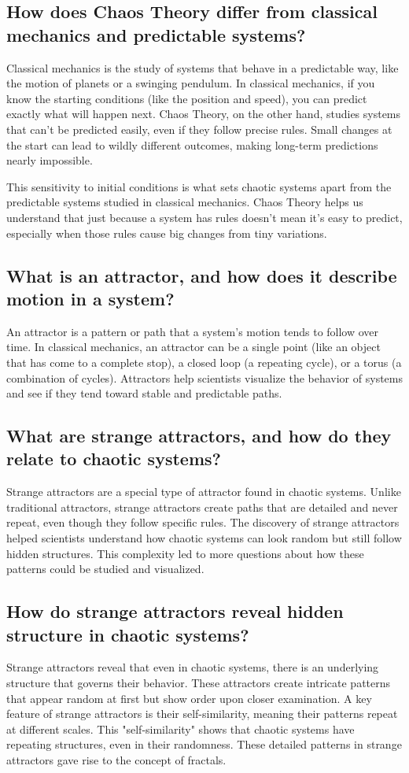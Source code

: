 \documentclass[12pt]{article}
\begin{document}
\subsection{How does Chaos Theory differ from classical mechanics and predictable systems?}
Classical mechanics is the study of systems that behave in a predictable way, like the motion of planets or a swinging pendulum. In classical mechanics, if you know the starting conditions (like the position and speed), you can predict exactly what will happen next. Chaos Theory, on the other hand, studies systems that can’t be predicted easily, even if they follow precise rules. Small changes at the start can lead to wildly different outcomes, making long-term predictions nearly impossible.

This sensitivity to initial conditions is what sets chaotic systems apart from the predictable systems studied in classical mechanics. Chaos Theory helps us understand that just because a system has rules doesn’t mean it’s easy to predict, especially when those rules cause big changes from tiny variations.

\subsection{What is an attractor, and how does it describe motion in a system?}
An attractor is a pattern or path that a system’s motion tends to follow over time. In classical mechanics, an attractor can be a single point (like an object that has come to a complete stop), a closed loop (a repeating cycle), or a torus (a combination of cycles). Attractors help scientists visualize the behavior of systems and see if they tend toward stable and predictable paths.

\subsection{What are strange attractors, and how do they relate to chaotic systems?}
Strange attractors are a special type of attractor found in chaotic systems. Unlike traditional attractors, strange attractors create paths that are detailed and never repeat, even though they follow specific rules. The discovery of strange attractors helped scientists understand how chaotic systems can look random but still follow hidden structures. This complexity led to more questions about how these patterns could be studied and visualized.

\subsection{How do strange attractors reveal hidden structure in chaotic systems?}
Strange attractors reveal that even in chaotic systems, there is an underlying structure that governs their behavior. These attractors create intricate patterns that appear random at first but show order upon closer examination. A key feature of strange attractors is their self-similarity, meaning their patterns repeat at different scales. This "self-similarity" shows that chaotic systems have repeating structures, even in their randomness. These detailed patterns in strange attractors gave rise to the concept of fractals.
\end{document}
